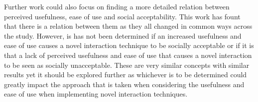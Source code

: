 \documentclass{l4proj}
\begin{document}
Further work could also focus on finding a more detailed relation between perceived usefulness, ease of use and social acceptability. This work has fount that there is a relation between them as they all changed in common ways across the study. However, is has not been determined if an increased usefulness and ease of use causes a novel interaction technique to be socially acceptable or if it is that a lack of perceived usefulness and ease of use that causes a novel interaction to be seen as socially unacceptable. These are very similar concepts with similar results yet it should be explored further as whichever is to be determined could greatly impact the approach that is taken when considering the usefulness and ease of use when implementing novel interaction techniques. 


\end{document}
